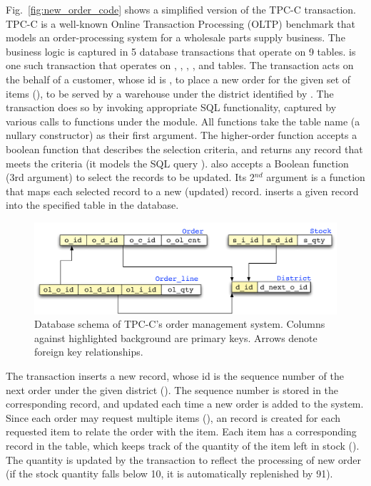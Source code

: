 Fig.~\ref{fig:new_order_code} shows a simplified version of the TPC-C
 transaction.  TPC-C is a well-known Online Transaction
Processing (OLTP) benchmark that models an order-processing system for
a wholesale parts supply business. The business logic is captured in 5
database transactions that operate on 9 tables.  is one
such transaction that operates on , ,
, , and  tables. The transaction
acts on the behalf of a customer, whose id is , to place a
new order for the given set of items (), to be served by
a warehouse under the district identified by . The
transaction does so by invoking appropriate SQL functionality,
captured by various calls to functions under the  module. All
 functions take the table name (a nullary constructor) as their
first argument. The higher-order  function accepts a
boolean function that describes the selection criteria, and returns
any record that meets the criteria (it models the SQL query \C{SELECT
  \ldots\xspace LIMIT 1}).  also accepts a Boolean
function (3rd argument) to select the records to be updated. Its
2$^{nd}$ argument is a function that maps each selected record to a new
(updated) record.  inserts a given record into the
specified table in the database.

\begin{figure}[!t]
\includegraphics[scale=0.5]{Figures/schema}
\caption{Database schema of TPC-C's order management system.
  Columns against highlighted background are primary keys. Arrows denote
  foreign key relationships.}
\label{fig:schema}
\end{figure}

The  transaction inserts a new  record, whose
id is the sequence number of the next order under the given district
(). The sequence number is stored in the corresponding
 record, and updated each time a new order is added to the
system. Since each order may request multiple items (),
an  record is created for each requested item to relate
the order with the item. Each item has a corresponding record in the
 table, which keeps track of the quantity of the item left in
stock (). The quantity is updated by the transaction to
reflect the processing of new order (if the stock quantity falls below
10, it is automatically replenished by 91).

